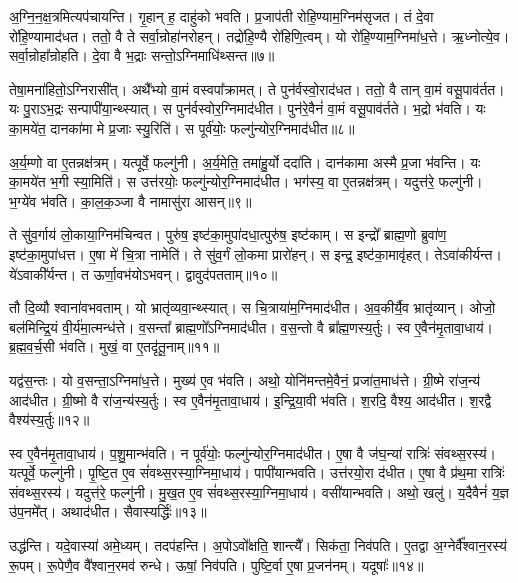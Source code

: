 अ॒ग्नि॒न॒क्ष॒त्रमित्यप॑चायन्ति।
गृ॒हान् ह॒ दाहु॑को भवति।
प्र॒जा\-प॑ती रोहि॒ण्याम॒ग्निम॑\-सृजत।
तं दे॒वा रो॑हि॒ण्यामाद॑धत।
ततो॒ वै ते सर्वा॒न्रोहा॑नरोहन्।
तद्रो॑हि॒ण्यै रो॑हिणि॒त्वम्।
यो रो॑हि॒ण्याम॒ग्निमा॑ध॒त्ते।
ऋ॒ध्नोत्ये॒व।
सर्वा॒न्रोहा᳚न्रोहति।
दे॒वा वै भ॒द्राः सन्तो॒\-ऽग्निमाधि॑थ्सन्त॥७॥

तेषा॒मना॑हितो॒\-ऽग्निरासी᳚त्।
अथै᳚भ्यो वा॒मं वस्वपा᳚क्रामत्।
ते पुन॑र्वस्वो॒राद॑धत।
ततो॒ वै तान् वा॒मं वसू॒पाव॑र्तत।
यः पु॒राऽभ॒द्रः सन्पापी॑या॒न्थ्स्यात्।
स पुन॑र्वस्वोर॒ग्निमाद॑धीत।
पुन॑रे॒वैनं॑ वा॒मं वसू॒पाव॑र्तते।
भ॒द्रो भ॑वति।
यः का॒मये॑त॒ दानका॑मा मे प्र॒जाः स्यु॒रिति॑।
स पूर्व॑योः॒ फल्गु॑न्योर॒ग्निमाद॑धीत॥८॥

अ॒र्य॒म्णो वा ए॒तन्नक्ष॑त्रम्।
यत्पूर्वे॒ फल्गु॑नी।
अ॒र्य॒मेति॒ तमा॑हु॒र्यो ददा॑ति।
दान॑कामा अस्मै प्र॒जा भ॑वन्ति।
यः का॒मये॑त भ॒गी स्या॒मिति॑।
स उत्त॑रयोः॒ फल्गु॑न्योर॒ग्निमाद॑धीत।
भग॑स्य॒ वा ए॒तन्नक्ष॑त्रम्।
यदुत्त॑रे॒ फल्गु॑नी।
भ॒ग्ये॑व भ॑वति।
का॒ल॒क॒ञ्जा वै नामासु॑रा आसन्॥९॥

ते सु॑व॒र्गाय॑ लो॒काया॒ग्निम॑चिन्वत।
पुरु॑ष॒ इष्ट॑का॒मुपा॑दधा॒त्\-पुरु॑ष॒ इष्ट॑काम्।
स इन्द्रो᳚ ब्राह्म॒णो ब्रुवा॑ण॒ इष्ट॑का॒मुपा॑धत्त।
ए॒षा मे॑ चि॒त्रा नामेति॑।
ते सु॑व॒र्गं लो॒कमा प्रारो॑हन्।
स इन्द्र॒ इष्ट॑का॒मावृ॑हत्।
तेऽवा॑कीर्यन्त।
ये॑ऽवाकी᳚र्यन्त।
त ऊर्णा॒वभ॑यो\-ऽभवन्।
द्वावुद॑पतताम्॥१०॥

तौ दि॒व्यौ श्वाना॑वभवताम्।
यो भ्रातृ॑व्यवा॒न्थ्स्यात्।
स चि॒त्राया॑म॒ग्निमाद॑धीत।
अ॒व॒कीर्यै॒व भ्रातृ॑व्यान्।
ओजो॒ बल॑मिन्द्रि॒यं वी॒र्य॑मा॒त्मन्ध॑त्ते।
व॒सन्ता᳚ ब्राह्म॒णो᳚\-ऽग्निमाद॑धीत।
व॒स॒न्तो वै ब्रा᳚ह्म॒णस्य॒र्तुः।
स्व ए॒वैन॑मृ॒तावा॒धाय॑।
ब्र॒ह्म॒व॒र्च॒सी भ॑वति।
मुखं॒ वा ए॒तदृ॑तू॒नाम्॥११॥

यद्व॑स॒न्तः।
यो व॒सन्ता॒\-ऽग्निमा॑ध॒त्ते।
मुख्य॑ ए॒व भ॑वति।
अथो॒ योनि॑मन्तमे॒वैनं॒ प्रजा॑त॒माध॑त्ते।
ग्री॒ष्मे रा॑ज॒न्य॑ आद॑धीत।
ग्री॒ष्मो वै रा॑ज॒न्य॑स्य॒र्तुः।
स्व ए॒वैन॑मृ॒तावा॒धाय॑।
इ॒न्द्रि॒या॒वी भ॑वति।
श॒रदि॒ वैश्य॒ आद॑धीत।
श॒रद्वै वैश्य॑स्य॒र्तुः॥१२॥

स्व ए॒वैन॑मृ॒तावा॒धाय॑।
प॒शु॒मान्भ॑वति।
न पूर्व॑योः॒ फल्गु॑न्योर॒ग्निमाद॑धीत।
ए॒षा वै ज॑घ॒न्या॑ रात्रिः॑ संवथ्स॒रस्य॑।
यत्पूर्वे॒ फल्गु॑नी।
पृ॒ष्टि॒त ए॒व सं॑वथ्स॒रस्या॒ग्निमा॒धाय॑।
पापी॑यान्भवति।
उत्त॑रयो॒रा द॑धीत।
ए॒षा वै प्र॑थ॒मा रात्रिः॑ संवथ्स॒रस्य॑।
यदुत्त॑रे॒ फल्गु॑नी।
मु॒ख॒त ए॒व सं॑वथ्स॒रस्या॒ग्निमा॒धाय॑।
वसी॑यान्भवति।
अथो॒ खलु॑।
य॒दैवैनं॑ य॒ज्ञ उ॑प॒नमे᳚त्।
अथाद॑धीत।
सैवास्यर्द्धिः॑॥१३॥\anuvakamend[खल्वा॑धिथ्सन्त॒ फल्गु॑न्योर॒ग्निमाद॑धीतासन्नपततामृतू॒नां वैश्य॑स्य॒र्तुरुत्त॑रे॒ फल्गु॑नी॒ षट्च॑]

उद्ध॑न्ति।
यदे॒वास्या॑ अमे॒ध्यम्।
तदप॑हन्ति।
अ॒पोऽवो᳚क्षति॒ शान्त्यै᳚।
सिक॑ता॒ निव॑पति।
ए॒तद्वा अ॒ग्नेर्वै᳚श्वान॒रस्य॑ रू॒पम्।
रू॒पेणै॒व वै᳚श्वान॒रमव॑ रुन्धे।
ऊषां॒ निव॑पति।
पुष्टि॒र्वा ए॒षा प्र॒जन॑नम्।
यदूषाः᳚॥१४॥


